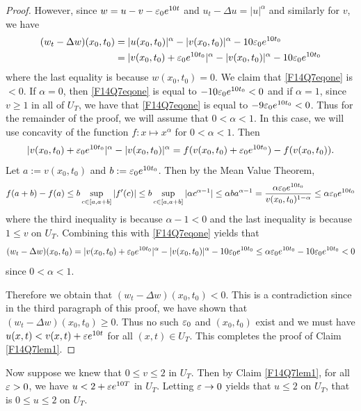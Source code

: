 \begin{proof}
However, since $w = u - v - \varepsilon_{0} e^{10t}$ and $u_{t} - \Delta u = |u|^{\alpha}$ and similarly for $v$, we have
\begin{align}\label{F14Q7eqone}
(w_{t} - \Delta w)(x_{0}, t_{0}) &= |u(x_{0}, t_{0})|^{\alpha} - |v(x_{0}, t_{0})|^{\alpha} - 10\varepsilon_0 e^{10t_{0}}\nonumber\\
& = |v(x_{0}, t_{0}) + \varepsilon_{0}e^{10t_{0}}|^{\alpha}- |v(x_{0}, t_{0})|^{\alpha} - 10\varepsilon_{0} e^{10t_{0}}
\end{align}
where the last equality is because $w(x_{0}, t_{0}) = 0$. We claim that \eqref{F14Q7eqone} is $< 0$.
If $\alpha = 0$, then \eqref{F14Q7eqone} is equal to $-10\varepsilon_{0}e^{10t_{0}} <0$ and if $\alpha = 1$, since $v \geq 1$ in all of $U_{T}$,
we have that \eqref{F14Q7eqone} is equal to $-9\varepsilon_{0}e^{10t_{0}} <0$. Thus for the remainder of the proof, we will assume
that $0 < \alpha < 1$. In this case, we will use concavity of the function
$f: x \mapsto x^{\alpha}$ for $0 <\alpha < 1$. Then
\begin{align*}
|v(x_{0}, t_{0}) + \varepsilon_{0}e^{10t_{0}}|^{\alpha}- |v(x_{0}, t_{0})|^{\alpha} = f(v(x_{0}, t_{0}) + \varepsilon_{0}e^{10t_{0}}) - f(v(x_{0}, t_{0})).
\end{align*}
Let $a := v(x_{0}, t_{0})$ and $b := \varepsilon_{0}e^{10t_{0}}$. Then by the Mean Value Theorem,
\begin{align*}
 f(a + b) - f(a) \leq b \sup_{c \in [a, a + b]}|f'(c)| \leq b \sup_{c \in [a, a + b]}|\alpha c^{\alpha - 1}| \leq \alpha b a^{\alpha - 1} = \frac{\alpha \varepsilon_{0}e^{10t_{0}}}{v(x_{0}, t_{0})^{1 - \alpha}} \leq \alpha \varepsilon_{0}e^{10t_{0}}
\end{align*}
where the third inequality is because $\alpha - 1 < 0$ and the last inequality
is because $1 \leq v$ on $U_{T}$. Combining this with \eqref{F14Q7eqone} yields that
\begin{align*}
(w_{t} - \Delta w)(x_{0}, t_{0}) = |v(x_{0}, t_{0}) + \varepsilon_{0}e^{10t_{0}}|^{\alpha}- |v(x_{0}, t_{0})|^{\alpha} - 10\varepsilon_{0} e^{10t_{0}} \leq \alpha \varepsilon_{0}e^{10t_{0}} - 10\varepsilon_{0} e^{10t_{0}} < 0
\end{align*}
since $0 <\alpha< 1$.

Therefore we obtain that $(w_{t} - \Delta w)(x_{0}, t_{0}) < 0$. This is a contradiction since in the third paragraph of this proof, we have shown that
$(w_{t} - \Delta w)(x_{0}, t_{0}) \geq 0$. Thus no such $\varepsilon_{0}$ and $(x_{0}, t_{0})$ exist and we must have
$u(x, t) < v(x, t) + \varepsilon e^{10t}$ for all $(x, t) \in U_{T}$. This completes the proof of Claim \ref{F14Q7lem1}.
\end{proof}
Now suppose we knew that $0 \leq v \leq 2$ in $U_{T}$. Then by Claim \ref{F14Q7lem1},
for all $\varepsilon > 0$, we have $u < 2 + \varepsilon e^{10T}$ in $U_{T}$. Letting $\varepsilon \rightarrow 0$
yields that $u \leq 2$ on $U_{T}$, that is $0 \leq u \leq 2$ on $U_{T}$.

